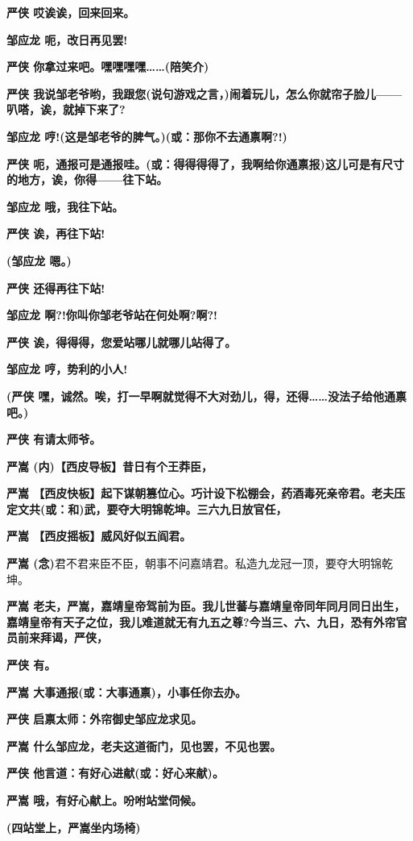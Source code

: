 \textbf{严侠 哎诶诶，回来回来。}

\textbf{邹应龙 呃，改日再见罢!}

\textbf{严侠 你拿过来吧。嘿嘿嘿嘿\ldots{}\ldots{}(陪笑介)}

\textbf{严侠
我说邹老爷哟，我跟您(说句游戏之言，)闹着玩儿，怎么你就帘子脸儿------叭嗒，诶，就掉下来了?}

\textbf{邹应龙 哼!(这是邹老爷的脾气。)(或：那你不去通禀啊?!)}

\textbf{严侠
呃，通报可是通报哇。(或：得得得得了，我啊给你通禀报)这儿可是有尺寸的地方，诶，你得------往下站。}

\textbf{邹应龙 哦，我往下站。}

\textbf{严侠 诶，再往下站!}

\textbf{(邹应龙 嗯。)}

\textbf{严侠 还得再往下站!}

\textbf{邹应龙 啊?!你叫你邹老爷站在何处啊?啊?!}

\textbf{严侠 诶，得得得，您爱站哪儿就哪儿站得了。}

\textbf{邹应龙 哼，势利的小人!}

\textbf{(严侠
嘿，诚然。唉，打一早啊就觉得不大对劲儿，得，还得\ldots{}\ldots{}没法子给他通禀吧。)}

\textbf{严侠 有请太师爷。}

\textbf{严嵩 (内)【西皮导板】昔日有个王莽臣，}

\textbf{严嵩
【西皮快板】起下谋朝篡位心。巧计设下松棚会，药酒毒死亲帝君。老夫压定文共(或：和)武，要夺大明锦乾坤。三六九日放官任，}

\textbf{严嵩 【西皮摇板】威风好似五阎君。}

\textbf{严嵩
(念)}君不君来臣不臣，朝事不问嘉靖君。私造九龙冠一顶，要夺大明锦乾坤。

\textbf{严嵩
老夫，严嵩，嘉靖皇帝驾前为臣。我儿世蕃与嘉靖皇帝同年同月同日出生，嘉靖皇帝有天子之位，我儿难道就无有九五之尊?今当三、六、九日，恐有外帘官员前来拜谒，严侠，}

\textbf{严侠 有。}

\textbf{严嵩 大事通报(或：大事通禀)，小事任你去办。}

\textbf{严侠 启禀太师：外帘御史邹应龙求见。}

\textbf{严嵩 什么邹应龙，老夫这道衙门，见也罢，不见也罢。}

\textbf{严侠 他言道：有好心进献(或：好心来献)。}

\textbf{严嵩 哦，有好心献上。吩咐站堂伺候。}

\textbf{(四站堂上，严嵩坐内场椅)}

